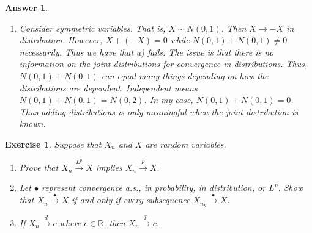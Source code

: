 \documentclass[12pt]{article}
\theoremstyle{colon}
\newtheorem{exercise}{Exercise}
\newtheorem*{answer}{Answer}
\begin{document}
\begin{answer}
\begin{enumerate}[label=\alph*)]
    \item Consider symmetric variables. That is, $X \sim N(0,1)$. Then $X \rightarrow -X$ in distribution. However, $X + (-X) = 0$ while $N(0,1) + N(0,1) \neq 0$ necessarily. Thus we have that a) fails. The issue is that there is no information on the joint distributions for convergence in distributions. Thus, $N(0,1) + N(0,1)$ can equal many things depending on how the distributions are dependent. Independent means $N(0,1) + N(0,1) = N(0,2)$. In my case, $N(0,1) + N(0,1) = 0$. Thus adding distributions is only meaningful when the joint distribution is known.
  \end{enumerate}
\end{answer}

\clearpage

\begin{exercise}
  Suppose that $X_n$ and $X$ are random variables.
  \begin{enumerate}[label=\arabic*)]
    \item Prove that $X_n \xrightarrow{L^p} X$ implies $X_n \xrightarrow{p} X$.
    \item Let $\bullet$ represent convergence a.s., in probability, in distribution, or $L^p$. Show that $X_n \xrightarrow{\bullet} X$ if and only if every subsequence $X_{n_k} \xrightarrow{\bullet} X$.
    \item If $X_n \xrightarrow{d} c$ where $c \in \mathbb{R}$, then $X_n \xrightarrow{p} c$.
  \end{enumerate}
\end{exercise}
\end{document}
